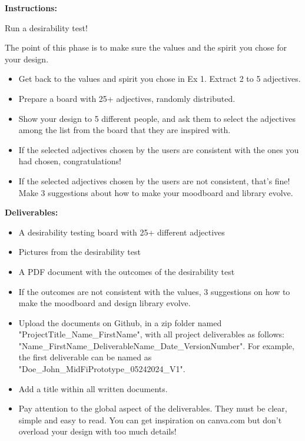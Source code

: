 \makeheaderfiles

\textbf{Instructions:}

Run a desirability test!

The point of this phase is to make sure the values and the spirit you chose for your design.

\begin{itemize}
\item Get back to the values and spirit you chose in Ex 1. Extract 2 to 5 adjectives.
\item Prepare a board with 25+ adjectives, randomly distributed.
\item Show your design to 5 different people, and ask them to select the adjectives among the list from the board that they are inspired with.
\item If the selected adjectives chosen by the users are consistent with the ones you had chosen, congratulations!
\item If the selected adjectives chosen by the users are not consistent, that's fine! Make 3 suggestions about how to make your moodboard and library evolve.
\end{itemize}

\textbf{Deliverables:}

\begin{itemize}
\item A desirability testing board with 25+ different adjectives
\item Pictures from the desirability test
\item A PDF document with the outcomes of the desirability test
\item If the outcomes are not consistent with the values, 3 suggestions on how to make the moodboard and design library evolve.
\item Upload the documents on Github, in a zip folder named "ProjectTitle\_Name\_FirstName", with all project deliverables as follows: "Name\_FirstName\_DeliverableName\_Date\_VersionNumber".  For example, the first deliverable can be named as "Doe\_John\_MidFiPrototype\_05242024\_V1".
\item Add a title within all written documents.
\item Pay attention to the global aspect of the deliverables. They must be clear, simple and easy to read. You can get inspiration on canva.com but don't overload your design with too much details!
\end{itemize}

